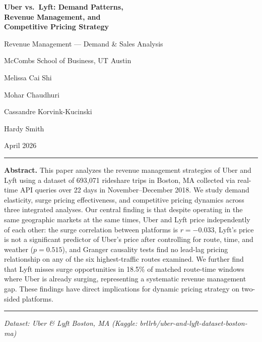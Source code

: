 \documentclass[11pt, letterpaper]{article}
\newenvironment{abstractbox}{%
  \begin{center}
  \begin{minipage}{0.92\textwidth}
  \rule{\linewidth}{1pt}
  \vspace{0.3em}
  \small
}{%
  \vspace{0.3em}
  \rule{\linewidth}{1pt}
  \end{minipage}
  \end{center}
}
\begin{document}

\begin{titlepage}
  \centering
  \vspace*{2cm}

  {\LARGE\bfseries Uber vs.\ Lyft: Demand Patterns,\\[0.3em]
  Revenue Management, and\\[0.3em]
  Competitive Pricing Strategy\par}

  \vspace{1.5cm}

  {\large Revenue Management — Demand \& Sales Analysis\par}
  {\large McCombs School of Business, UT Austin\par}

  \vspace{1cm}

  {\normalsize Melissa Cai Shi \par}
  {\normalsize Mohar Chaudhuri \par}
  {\normalsize Cassandre Korvink-Kucinski \par}
  {\normalsize Hardy Smith \par}

  \vspace{0.5cm}

  {\normalsize April 2026\par}

  \vspace{1.5cm}

  \begin{abstractbox}
    \textbf{Abstract.} This paper analyzes the revenue management strategies
    of Uber and Lyft using a dataset of 693,071 rideshare trips in Boston,
    MA collected via real-time API queries over 22 days in November--December
    2018. We study demand elasticity, surge pricing effectiveness, and
    competitive pricing dynamics across three integrated analyses.
    Our central finding is that despite operating in the same geographic
    markets at the same times, Uber and Lyft price independently of each
    other: the surge correlation between platforms is $r = -0.033$, Lyft's
    price is not a significant predictor of Uber's price after controlling
    for route, time, and weather ($p = 0.515$), and Granger causality tests
    find no lead-lag pricing relationship on any of the six highest-traffic
    routes examined. We further find that Lyft misses surge opportunities
    in 18.5\% of matched route-time windows where Uber is already surging,
    representing a systematic revenue management gap. These findings have
    direct implications for dynamic pricing strategy on two-sided platforms.
  \end{abstractbox}

  \vspace{1.5cm}
  {\small\textit{Dataset: Uber \& Lyft Boston, MA (Kaggle: brllrb/uber-and-lyft-dataset-boston-ma)}}
\end{titlepage}
\end{document}
